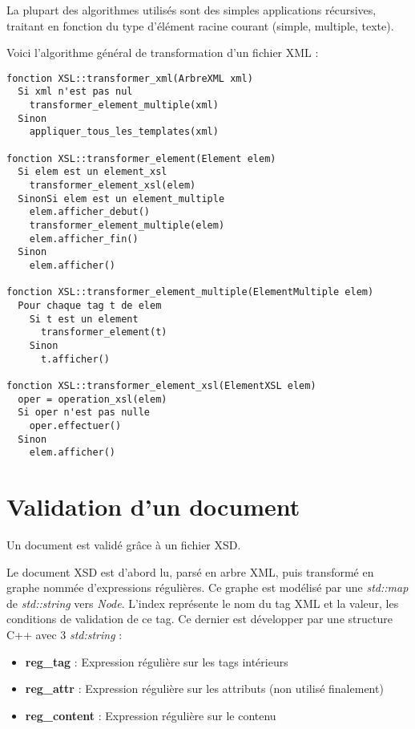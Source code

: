 \documentclass[10pt, a4paper]{article}
\begin{document}
La plupart des algorithmes utilisés sont des simples applications
récursives, traitant en fonction du type d'élément racine courant
(simple, multiple, texte).

Voici l'algorithme général de transformation d'un fichier XML :

\begin{verbatim}
fonction XSL::transformer_xml(ArbreXML xml)
  Si xml n'est pas nul
    transformer_element_multiple(xml)
  Sinon
    appliquer_tous_les_templates(xml)

fonction XSL::transformer_element(Element elem)
  Si elem est un element_xsl
    transformer_element_xsl(elem)
  SinonSi elem est un element_multiple
    elem.afficher_debut()
    transformer_element_multiple(elem)
    elem.afficher_fin()
  Sinon
    elem.afficher()

fonction XSL::transformer_element_multiple(ElementMultiple elem)
  Pour chaque tag t de elem
    Si t est un element
      transformer_element(t)
    Sinon
      t.afficher()

fonction XSL::transformer_element_xsl(ElementXSL elem)
  oper = operation_xsl(elem)
  Si oper n'est pas nulle
    oper.effectuer()
  Sinon
    elem.afficher()
\end{verbatim}

\section{Validation d'un document}\label{validation-dun-document}

Un document est validé grâce à un fichier XSD.

Le document XSD est d'abord lu, parsé en arbre XML, puis transformé en
graphe nommée d'expressions régulières. Ce graphe est modélisé par une
\emph{std::map} de \emph{std::string} vers \emph{Node}. L'index
représente le nom du tag XML et la valeur, les conditions de validation
de ce tag. Ce dernier est développer par une structure C++ avec 3
\emph{std:string} :

\begin{itemize}
\itemsep1pt\parskip0pt
\item
  \textbf{reg\_tag} : Expression régulière sur les tags intérieurs
\item
  \textbf{reg\_attr} : Expression régulière sur les attributs (non
  utilisé finalement)
\item
  \textbf{reg\_content} : Expression régulière sur le contenu
\end{itemize}
\end{document}

